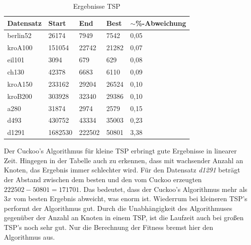 \documentclass[conference]{IEEEtran}
\begin{document}
      \begin{table}[b]
        \label{table:TSP}
        \centering
        \begin{tabular}{|l|ll|l|l|}
        \hline
            Datensatz & \multicolumn{1}{l|}{Start} & End  & Best & $\sim$\%-Abweichung \\ \hline
            berlin52  & \multicolumn{1}{l|}{26174} & 7949 & 7542 & 0,05       \\ \hline
            kroA100  & \multicolumn{1}{l|}{151054} & 22742 & 21282 & 0,07      \\ \hline
            eil101  & \multicolumn{1}{l|}{3094} & 679 & 629 &  0,08      \\ \hline
            ch130  & \multicolumn{1}{l|}{42378} & 6683 & 6110 & 0,09       \\ \hline
            kroA150  & \multicolumn{1}{l|}{233162} & 29204 &   26524& 0,10     \\ \hline
            kroB200  & \multicolumn{1}{l|}{303928} &  32340&  29386 & 0,10     \\ \hline
            a280  & \multicolumn{1}{l|}{31874} & 2974 & 2579 & 0,15       \\ \hline
            d493  & \multicolumn{1}{l|}{430752} & 43334 & 35003 & 0,23       \\ \hline
            d1291  & \multicolumn{1}{l|}{1682530} & 222502 & 50801 & 3,38       \\ \hline
        \end{tabular}
        \caption{Ergebnisse TSP}
      \end{table}

      Der Cuckoo's Algorithmus für kleine TSP erbringt gute Ergebnisse in linearer Zeit. Hingegen in der Tabelle auch zu erkennen, dass 
      mit wachsender Anzahl an Knoten, das Ergebnis immer schlechter wird. Für den Datensatz \textit{d1291} beträgt der Abstand zwischen dem besten und den vom Cuckoo erzeugten
      $222502 - 50801 = 171701$. Das bedeutet, dass der Cuckoo's Algorithmus mehr als $3x$ vom besten Ergebnis abweicht, was enorm ist. 
      Wiederrum bei kleineren TSP's performt der Algorithmus gut. 
      Durch die Unabhängigkeit des Algorithmuses gegenüber der Anzahl an Knoten in einem TSP, ist die Laufzeit auch bei großen
      TSP's noch sehr gut. Nur die Berechnung der Fitness bremst hier den Algorithmus aus. 
      
\end{document}

